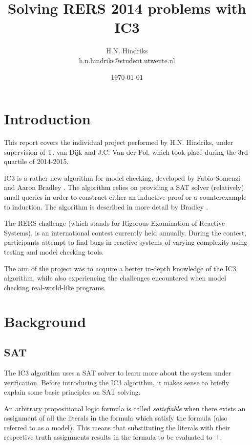 \documentclass[a4paper]{article}
\begin{document}
\title{Solving RERS 2014 problems with IC3}
\author{H.N. Hindriks\\h.n.hindriks@student.utwente.nl}
\date{\today}
\maketitle

\section{Introduction}
This report covers the individual project performed by H.N. Hindriks, under supervision of T. van Dijk and J.C. Van der Pol, which took place during the 3rd quartile of 2014-2015.

IC3 is a rather new algorithm for model checking, developed by Fabio Somenzi and Aaron Bradley \cite{Bradley2007}. The algorithm relies on providing a SAT solver (relatively) small queries in order to construct either an inductive proof or a counterexample to induction. The algorithm is described in more detail by Bradley \cite{Bradley2011}.

The RERS challenge (which stands for Rigorous Examination of Reactive Systems), is an international contest currently held annually. During the contest, participants attempt to find bugs in reactive systems of varying complexity using testing and model checking tools.

The aim of the project was to acquire a better in-depth knowledge of the IC3 algorithm, while also experiencing the challenges encountered when model checking real-world-like programs.

\newpage
\tableofcontents

\newpage
\section{Background}
\subsection{SAT}
The IC3 algorithm uses a SAT solver to learn more about the system under verification. Before introducing the IC3 algorithm, it makes sense to briefly explain some basic principles on SAT solving.

An arbitrary propositional logic formula is called \emph{satisfiable} when there exists an assignment of all the literals in the formula which satisfy the formula (also referred to as a model). This means that substituting the literals with their respective truth assignments results in the formula to be evaluated to $\top$.
\end{document}
